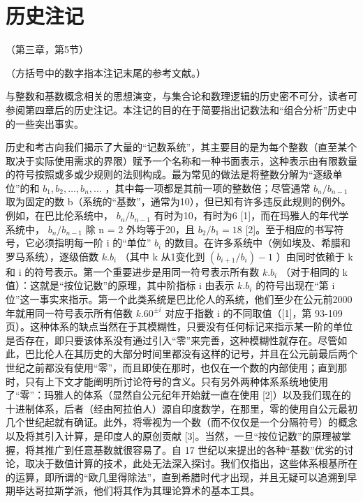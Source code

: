 \section*{历史注记}
{}

（第三章，第5节）

（方括号中的数字指本注记末尾的参考文献。）

与整数和基数概念相关的思想演变，与集合论和数理逻辑的历史密不可分，读者可参阅第四章后的历史注记。本注记的目的在于简要指出记数法和“组合分析”历史中的一些突出事实。

历史和考古向我们揭示了大量的“记数系统”，其主要目的是为每个整数（直至某个取决于实际使用需求的界限）赋予一个名称和一种书面表示，这种表示由有限数量的符号按照或多或少规则的法则构成。最为常见的做法是将整数分解为“逐级单位”的和 \(b_{1}, b_{2}, \ldots, b_{n}, \ldots\) ，其中每一项都是其前一项的整数倍；尽管通常 \(b_{n}/b_{n-1}\) 取为固定的数 b（系统的“基数”，通常为10），但已知有许多违反此规则的例外。例如，在巴比伦系统中， \(b_{n}/b_{n-1}\) 有时为10，有时为6 {[}1{]}，而在玛雅人的年代学系统中， \(b_{n}/b_{n-1}\) 除 n = 2 外均等于20，且 \(b_{2}/b_{1} = 18\) {[}2{]}。至于相应的书写符号，它必须指明每一阶 i 的“单位” \(b_{i}\) 的数目。在许多系统中（例如埃及、希腊和罗马系统），逐级倍数 \(k.b_{i}\) （其中 k 从1变化到 \((b_{i+1}/b_{i}) - 1\) ）由同时依赖于 k 和 i 的符号表示。第一个重要进步是用同一符号表示所有数 \(k.b_{i}\) （对于相同的 k 值）：这就是“按位记数”的原理，其中阶指标 i 由表示 \(k.b_{i}\) 的符号出现在“第 i 位”这一事实来指示。第一个此类系统是巴比伦人的系统，他们至少在公元前2000年就用同一符号表示所有倍数 \(k.60^{\pm i}\) 对应于指数 i 的不同取值（{[}1{]}，第 93-109 页）。这种体系的缺点当然在于其模糊性，只要没有任何标记来指示某一阶的单位是否存在，即只要该体系没有通过引入“零”来完善，这种模糊性就存在。尽管如此，巴比伦人在其历史的大部分时间里都没有这样的记号，并且在公元前最后两个世纪之前都没有使用“零”，而且即使在那时，也仅在一个数的内部使用；直到那时，只有上下文才能阐明所讨论符号的含义。只有另外两种体系系统地使用了“零”：玛雅人的体系（显然自公元纪年开始就一直在使用 {[}2{]}）以及我们现在的十进制体系，后者（经由阿拉伯人）源自印度数学，在那里，零的使用自公元最初几个世纪起就有确证。此外，将零视为一个数（而不仅仅是一个分隔符号）的概念以及将其引入计算，是印度人的原创贡献 {[}3{]}。当然，一旦“按位记数”的原理被掌握，将其推广到任意基数就很容易了。自 17 世纪以来提出的各种“基数”优劣的讨论，取决于数值计算的技术，此处无法深入探讨。我们仅指出，这些体系根基所在的运算，即所谓的“欧几里得除法”，直到希腊时代才出现，并且无疑可以追溯到早期毕达哥拉斯学派，他们将其作为其理论算术的基本工具。

